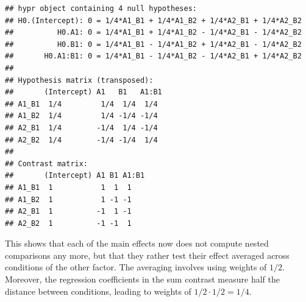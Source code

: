 \documentclass[12pt,]{krantz}
\newenvironment{Shaded}{\begin{snugshade}}{\end{snugshade}}
\newcommand{\CommentTok}[1]{\textcolor[rgb]{0.56,0.35,0.01}{\textit{#1}}}
\newcommand{\DecValTok}[1]{\textcolor[rgb]{0.00,0.00,0.81}{#1}}
\newcommand{\KeywordTok}[1]{\textcolor[rgb]{0.13,0.29,0.53}{\textbf{#1}}}
\newcommand{\NormalTok}[1]{#1}
\newcommand{\OperatorTok}[1]{\textcolor[rgb]{0.81,0.36,0.00}{\textbf{#1}}}
\newcommand{\StringTok}[1]{\textcolor[rgb]{0.31,0.60,0.02}{#1}}
\theoremstyle{definition}
\theoremstyle{definition}
\theoremstyle{definition}
\theoremstyle{remark}
\begin{document}
\begin{Shaded}
\end{Shaded}

\begin{verbatim}
## hypr object containing 4 null hypotheses:
## H0.(Intercept): 0 = 1/4*A1_B1 + 1/4*A1_B2 + 1/4*A2_B1 + 1/4*A2_B2
##          H0.A1: 0 = 1/4*A1_B1 + 1/4*A1_B2 - 1/4*A2_B1 - 1/4*A2_B2
##          H0.B1: 0 = 1/4*A1_B1 - 1/4*A1_B2 + 1/4*A2_B1 - 1/4*A2_B2
##       H0.A1:B1: 0 = 1/4*A1_B1 - 1/4*A1_B2 - 1/4*A2_B1 + 1/4*A2_B2
## 
## Hypothesis matrix (transposed):
##       (Intercept) A1   B1   A1:B1
## A1_B1  1/4         1/4  1/4  1/4 
## A1_B2  1/4         1/4 -1/4 -1/4 
## A2_B1  1/4        -1/4  1/4 -1/4 
## A2_B2  1/4        -1/4 -1/4  1/4 
## 
## Contrast matrix:
##       (Intercept) A1 B1 A1:B1
## A1_B1  1           1  1  1   
## A1_B2  1           1 -1 -1   
## A2_B1  1          -1  1 -1   
## A2_B2  1          -1 -1  1
\end{verbatim}

This shows that each of the main effects now does not compute nested comparisons any more, but that they rather test their effect averaged across conditions of the other factor. The averaging involves using weights of \(1/2\). Moreover, the regression coefficients in the sum contrast measure half the distance between conditions, leading to weights of \(1/2 \cdot 1/2 = 1/4\).
\end{document}
